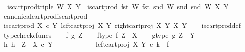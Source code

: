 \begin{isabellebody}
\ \ {\isachardoublequoteopen}is{\isacharunderscore}{\kern0pt}cart{\isacharunderscore}{\kern0pt}prod{\isacharunderscore}{\kern0pt}triple\ W{\isasympi}\ X\ Y\ {\isasymequiv}\ is{\isacharunderscore}{\kern0pt}cart{\isacharunderscore}{\kern0pt}prod\ {\isacharparenleft}{\kern0pt}fst\ W{\isasympi}{\isacharparenright}{\kern0pt}\ {\isacharparenleft}{\kern0pt}fst\ {\isacharparenleft}{\kern0pt}snd\ W{\isasympi}{\isacharparenright}{\kern0pt}{\isacharparenright}{\kern0pt}\ {\isacharparenleft}{\kern0pt}snd\ {\isacharparenleft}{\kern0pt}snd\ W{\isasympi}{\isacharparenright}{\kern0pt}{\isacharparenright}{\kern0pt}\ X\ Y{\isachardoublequoteclose}\isanewline
\isanewline
{}\isamarkupfalse%
\ canonical{\isacharunderscore}{\kern0pt}cart{\isacharunderscore}{\kern0pt}prod{\isacharunderscore}{\kern0pt}is{\isacharunderscore}{\kern0pt}cart{\isacharunderscore}{\kern0pt}prod{\isacharcolon}{\kern0pt}\isanewline
\ {\isachardoublequoteopen}is{\isacharunderscore}{\kern0pt}cart{\isacharunderscore}{\kern0pt}prod\ {\isacharparenleft}{\kern0pt}X\ {\isasymtimes}\isactrlsub c\ Y{\isacharparenright}{\kern0pt}\ {\isacharparenleft}{\kern0pt}left{\isacharunderscore}{\kern0pt}cart{\isacharunderscore}{\kern0pt}proj\ X\ Y{\isacharparenright}{\kern0pt}\ {\isacharparenleft}{\kern0pt}right{\isacharunderscore}{\kern0pt}cart{\isacharunderscore}{\kern0pt}proj\ X\ Y{\isacharparenright}{\kern0pt}\ X\ Y{\isachardoublequoteclose}\isanewline
%
\isadelimproof
\ \ %
\endisadelimproof
%
\isatagproof
{}\isamarkupfalse%
\ is{\isacharunderscore}{\kern0pt}cart{\isacharunderscore}{\kern0pt}prod{\isacharunderscore}{\kern0pt}def\isanewline
{}\isamarkupfalse%
\ {\isacharparenleft}{\kern0pt}typecheck{\isacharunderscore}{\kern0pt}cfuncs{\isacharparenright}{\kern0pt}\isanewline
\ \ \isamarkupfalse%
\ f\ g\ Z\isanewline
\ \ \isamarkupfalse%
\ f{\isacharunderscore}{\kern0pt}type{\isacharcolon}{\kern0pt}\ {\isachardoublequoteopen}f{\isacharcolon}{\kern0pt}\ Z\ {\isasymrightarrow}\ X{\isachardoublequoteclose}\isanewline
\ \ \isamarkupfalse%
\ g{\isacharunderscore}{\kern0pt}type{\isacharcolon}{\kern0pt}\ {\isachardoublequoteopen}g{\isacharcolon}{\kern0pt}\ Z\ {\isasymrightarrow}\ Y{\isachardoublequoteclose}\isanewline
\ \ \isamarkupfalse%
\ {\isachardoublequoteopen}{\isasymexists}h{\isachardot}{\kern0pt}\ h\ {\isacharcolon}{\kern0pt}\ Z\ {\isasymrightarrow}\ X\ {\isasymtimes}\isactrlsub c\ Y\ {\isasymand}\isanewline
\ \ \ \ \ \ \ \ \ \ \ left{\isacharunderscore}{\kern0pt}cart{\isacharunderscore}{\kern0pt}proj\ X\ Y\ {\isasymcirc}\isactrlsub c\ h\ {\isacharequal}{\kern0pt}\ f\ {\isasymand}\isanewline

\end{isabellebody}
